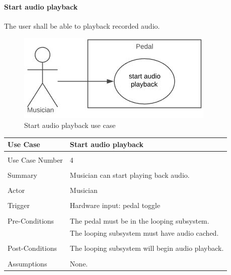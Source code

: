       
        \paragraph{Start audio playback} 
            The user shall be able to playback recorded audio.
            \begin{figure}[!ht]
                \centering
                \includegraphics[width=.5\textwidth]{diagrams/use_cases/uc-play-start.JPG}
                \caption{Start audio playback use case}
                \label{fig:uc-play-start}
            \end{figure}
            \clearpage
            \begin{table}[!ht]
                \centering
                \begin{tabular}{l l}
                    Use Case & Start audio playback \\ 
                    \hline \\
                    Use Case Number & 4 \\ \\
                    Summary & Musician can start playing back audio. \\ \\
                    Actor & Musician \\ \\
                    Trigger & Hardware input: pedal toggle \\ \\
                    Pre-Conditions & The pedal must be in the looping subsystem. \\
                    & The looping subsystem must have audio cached. \\ \\
                    Post-Conditions & The looping subsystem will begin audio playback. \\ \\
                    Assumptions & None.\\ 
                \end{tabular}
            \end{table}
            
